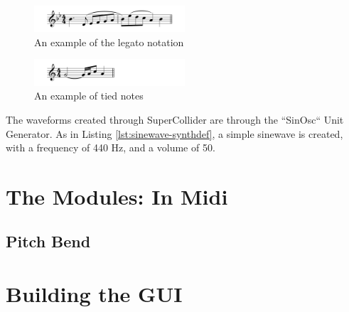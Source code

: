 \begin{figure}
  \centering
  \includegraphics[width=0.5\textwidth]{figures/legato-example.png}
  \caption{An example of the legato notation}
  \label{fig:legato-example}
\end{figure}

\begin{figure}
  \centering
  \includegraphics[width=0.5\textwidth]{figures/tied-notes-example.png}
  \caption{An example of tied notes}
  \label{fig:tied-notes-example}
\end{figure}

The waveforms created through SuperCollider are through the ``SinOsc`` Unit Generator. As in Listing \ref{lst:sinewave-synthdef}, a simple sinewave is created, with a frequency of 440 Hz, and a volume of 50.


\section{The Modules: In Midi}\label{section:the-modules-midi}

\subsection{Pitch Bend}

\section{Building the GUI}\label{section:building-the-gui}